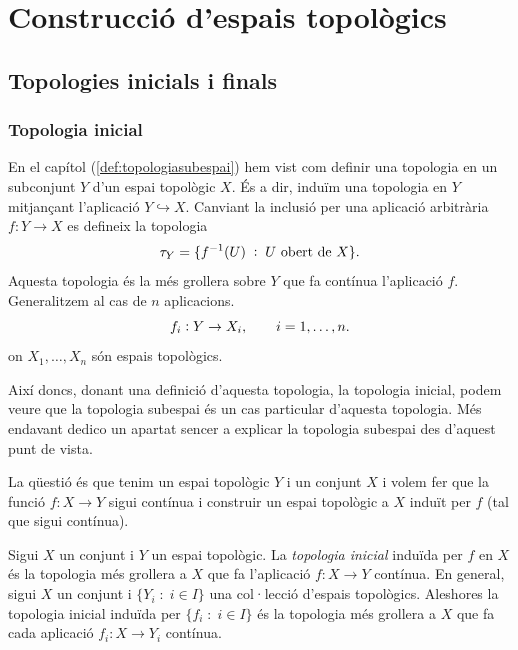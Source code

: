 \documentclass[../main.tex]{subfiles}
\begin{document}
 \chapter{Construcció d'espais topològics}

\section{Topologies inicials i finals}

\subsection{Topologia inicial}

En el capítol (\ref{def:topologiasubespai}) hem vist com definir una topologia en un subconjunt $Y$ d'un espai topològic $X$. És a dir, induïm una topologia en $Y$ mitjançant l'aplicació $Y\hookrightarrow X$. Canviant la inclusió per una aplicació arbitrària $f:Y\rightarrow X$ es defineix la topologia
\begin{equation}
    \notag
    \tau_Y = \{f^{-1}(U)\;:\;U\text{ obert de }X\} .
\end{equation}
Aquesta topologia és la més grollera sobre $Y$ que fa contínua l'aplicació $f$. Generalitzem al cas de $n$ aplicacions.
\begin{equation}
    \notag
    f_i: Y\rightarrow X_i,\qquad i=1,\ldots, n.
\end{equation}
on $X_1,\ldots, X_n$ són espais topològics.

Així doncs, donant una definició d'aquesta topologia, la topologia inicial, podem veure que la topologia subespai és un cas particular d'aquesta topologia. Més endavant dedico un apartat sencer a explicar la topologia subespai des d'aquest punt de vista.

La qüestió és que tenim un espai topològic $Y$ i un conjunt $X$ i volem fer que la funció $f:X\rightarrow Y$ sigui contínua i construir un espai topològic a $X$ induït per $f$ (tal que sigui contínua).

\begin{defi}
\label{def:topologiainicial} Sigui $X$ un conjunt i $Y$ un espai topològic. La \textit{topologia inicial} induïda per $f$ en $X$ és la topologia més grollera a $X$ que fa l'aplicació $f:X\rightarrow Y$ contínua. En general, sigui $X$ un conjunt i $\{Y_i\;:\;i\in I\}$ una col·lecció d'espais topològics. Aleshores la topologia inicial induïda per $\{f_i\;:\;i\in I\}$ és la topologia més grollera a $X$ que fa cada aplicació $f_i:X\rightarrow Y_i$ contínua.
\end{defi}
\end{document}
